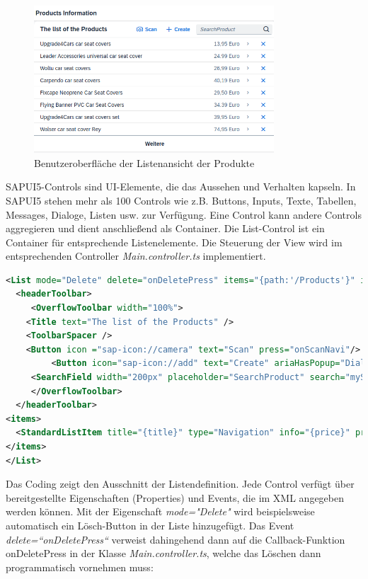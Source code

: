 \begin{figure}[htbp]
 \centering
 \includegraphics[width=0.8\textwidth]{Bilder/ui5 freestyle/3_20_Listeansicht.png}
 \caption{Benutzeroberfläche der Listenansicht der Produkte}
\end{figure}

SAPUI5-Controls sind UI-Elemente, die das Aussehen und Verhalten kapseln. In SAPUI5 stehen mehr als 100 Controls wie z.B. Buttons, Inputs, Texte, Tabellen, Messages, Dialoge, Listen usw. zur Verfügung. Eine Control kann andere Controls aggregieren und dient anschließend als Container. Die List-Control ist ein Container für entsprechende Listenelemente. Die Steuerung der View wird im entsprechenden Controller \textit{Main.controller.ts} implementiert. 

\begin{lstlisting}[language=XML,  caption=Auszüge aus der View \texttt{Main.view.xml}]
<List mode="Delete" delete="onDeletePress" items="{path:'/Products'}" id="productsList">
  <headerToolbar>
     <OverflowToolbar width="100%">
	<Title text="The list of the Products" />
	<ToolbarSpacer />
	<Button icon ="sap-icon://camera" text="Scan" press="onScanNavi"/>
         <Button icon="sap-icon://add" text="Create" ariaHasPopup="Dialog" press="pressAddInList" />
     <SearchField width="200px" placeholder="SearchProduct" search="mySearchProduct" />
     </OverflowToolbar>
  </headerToolbar>
<items>
  <StandardListItem title="{title}" type="Navigation" info="{price}" press="onItemPress"/>
</items>
</List>
\end{lstlisting}  

Das Coding zeigt den Ausschnitt der Listendefinition. Jede Control verfügt über bereitgestellte Eigenschaften (Properties) und Events, die im XML angegeben werden können. Mit der Eigenschaft \textit{mode="Delete"} wird beispielsweise automatisch ein Lösch-Button in der Liste hinzugefügt. Das Event \textit{delete=“onDeletePress“} verweist dahingehend dann auf die Callback-Funktion onDeletePress in der Klasse \textit{Main.controller.ts}, welche das Löschen dann programmatisch vornehmen muss:

